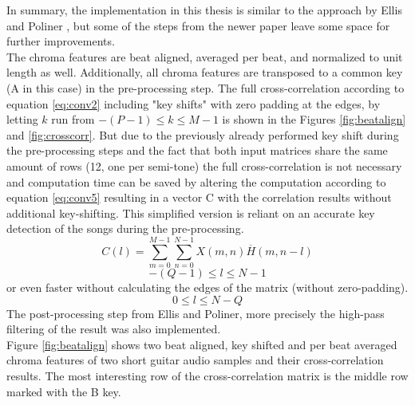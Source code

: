 In summary, the implementation in this thesis is similar to the approach by Ellis and Poliner \cite{chroma3}, but some of the steps from the newer paper \cite{cover802} leave some space for further improvements.\\ The chroma features are beat aligned, averaged per beat, and normalized to unit length as well. Additionally, all chroma features are transposed to a common key (A in this case) in the pre-processing step. The full cross-correlation according to equation \ref{eq:conv2} including "key shifts" with zero padding at the edges, by letting $k$ run from $-(P - 1) \leq k \leq M - 1$ is shown in the Figures \ref{fig:beatalign} and \ref{fig:crosscorr}. But due to the previously already performed key shift during the pre-processing steps and the fact that both input matrices share the same amount of rows (12, one per semi-tone) the full cross-correlation is not necessary and computation time can be saved by altering the computation according to equation \ref{eq:conv5} resulting in a vector C with the correlation results without additional key-shifting. This simplified version is reliant on an accurate key detection of the songs during the pre-processing.
\begin{equation} \label{eq:conv5}
C(l) = \sum_{m = 0}^{M - 1}{\sum_{n = 0}^{N - 1}{X(m, n)\overline{H}(m, n - l)}}
\end{equation}
\begin{equation} \label{eq:conv6}
-(Q - 1) \leq l \leq N - 1
\end{equation}
or even faster without calculating the edges of the matrix (without zero-padding).
\begin{equation} \label{eq:conv7}
0 \leq l \leq N - Q
\end{equation}
The post-processing step from Ellis and Poliner, more precisely the high-pass filtering of the result was also implemented.\\
Figure \ref{fig:beatalign} shows two beat aligned, key shifted and per beat averaged chroma features of two short guitar audio samples and their cross-correlation results. The most interesting row of the cross-correlation matrix is the middle row marked with the B key. %
